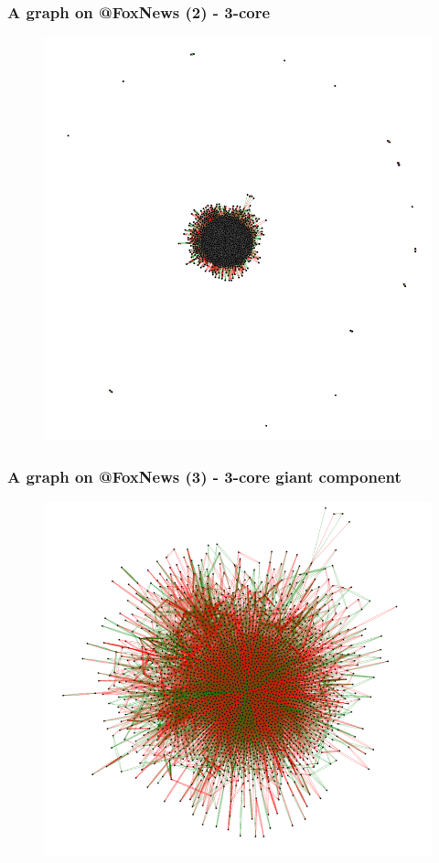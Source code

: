 \documentclass{beamer}
\begin{document}
\begin{frame}[c]
    \frametitle{A graph on @FoxNews (2) - 3-core}
    \begin{figure}[htpb]
        \centering
        \includegraphics[width=0.8\linewidth]{img/foxnews_20_3.png}
        \label{fig:img/foxnews_20_3}
    \end{figure}
\end{frame}

\begin{frame}[c]
    \frametitle{A graph on @FoxNews (3) - 3-core giant component}
    \begin{figure}[htpb]
        \centering
        \includegraphics[width=0.8\linewidth]{img/foxnews_20_3_giant.png}
        \label{fig:img/foxnews_20_3}
    \end{figure}
\end{frame}
\end{document}
